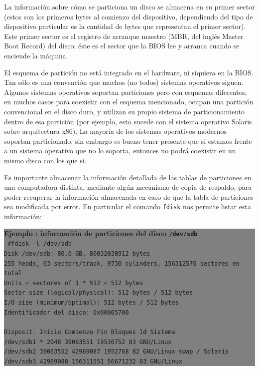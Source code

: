 \documentclass[12pt]{article}
\begin{document}
La información sobre cómo se particiona un disco se almacena en su primer 
sector (estos son los primeros bytes al comienzo del dispositivo, 
dependiendo del tipo de dispositivo particular es la cantidad de bytes 
que representan el primer sector). Este primer sector es el registro de 
arranque maestro (MBR, del inglés Master Boot Record) del disco; éste es 
el sector que la BIOS lee y arranca cuando se enciende la máquina. 

El esquema de partición no está integrado en el hardware, ni siquiera 
en la BIOS. Tan sólo es una convención que muchos (no todos) sistemas 
operativos siguen. Algunos sistemas operativos soportan particiones pero 
con esquemas diferentes, en muchos casos para coexistir con el esquema 
mencionado, ocupan una partición convencional en el disco duro, y 
utilizan su propio sistema de particionamiento dentro de esa partición 
(por ejemplo, esto sucede con el sistema operativo Solaris sobre 
arquitectura x86). La mayoría de los sistemas operativos modernos
soportan particionado, sin embargo es bueno tener presente que si estamos 
frente a un sistema operativo  que no lo soporta, entonces  no podrá 
coexistir en un mismo disco con los que si. 

Es importante almacenar la información detallada de las tablas de 
particiones en una computadora distinta, mediante algún mecanismo de 
copia de respaldo, para poder recuperar la información almacenada en 
caso de que la tabla de particiones sea modificada por error. En 
particular el comando \texttt{fdisk} nos permite listar esta información: 

\colorbox{grey}{\parbox[t]{0.95\linewidth}{ \vspace*{0.5cm} { 
{\bf Ejemplo : información de particiones del disco \texttt{/dev/sdb}}\\
{\tt
\#fdisk -l /dev/sdb\\
Disk /dev/sdb: 80.0 GB, 80032038912 bytes\\
255 heads, 63 sectors/track, 9730 cylinders, 156312576 sectores en total\\
Units = sectores of 1 * 512 = 512 bytes\\
Sector size (logical/physical): 512 bytes / 512 bytes\\
I/O size (minimum/optimal): 512 bytes / 512 bytes\\
Identificador del disco: 0x00005700\\
\\
Disposit. Inicio    Comienzo      Fin      Bloques  Id  Sistema\\
/dev/sdb1   *        2048    39063551    19530752   83  GNU/Linux\\
/dev/sdb2        39063552    42969087     1952768   82  GNU/Linux swap / Solaris\\
/dev/sdb3        42969088   156311551    56671232   83  GNU/Linux\\
}
} \vspace*{0.5cm} } } 
\end{document}
